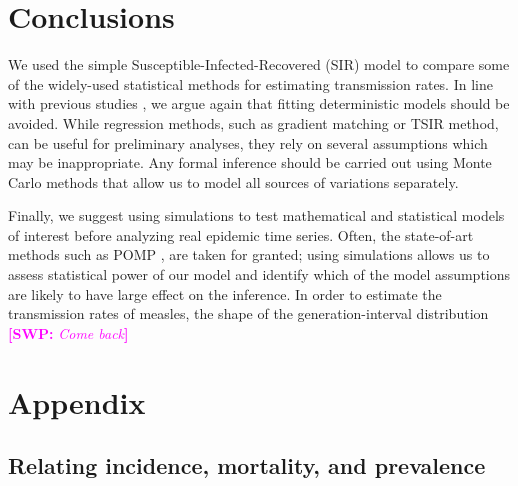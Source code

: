 \documentclass{article}
\newcommand{\comment}[3]{\textcolor{#1}{\textbf{[#2: }\textsl{#3}\textbf{]}}}
\newcommand{\swp}[1]{\comment{magenta}{SWP}{#1}}
\begin{document}
\section{Conclusions}

We used the simple Susceptible-Infected-Recovered (SIR) model to compare some of the widely-used statistical methods for estimating transmission rates.
In line with previous studies \citep{king2015avoidable, taylor2016stochasticity}, we argue again that fitting deterministic models should be avoided.
While regression methods, such as gradient matching or TSIR method, can be useful for preliminary analyses, 
they rely on several assumptions which may be inappropriate.
Any formal inference should be carried out using Monte Carlo methods that allow us to model all sources of variations separately.

Finally, we suggest using simulations to test mathematical and statistical models of interest before analyzing real epidemic time series.
Often, the state-of-art methods such as POMP \citep{king2015statistical}, are taken for granted;
using simulations allows us to assess statistical power of our model and identify which of the model assumptions are likely to have large effect on the inference.
In order to estimate the transmission rates of measles, the shape of the generation-interval distribution 
\swp{Come back}


\pagebreak

{} 


\pagebreak

\appendix
\renewcommand{\thesection}{\Alph{section}}
\renewcommand{\thesubsection}{A.\arabic{subsection}}

\section{Appendix}

\subsection{Relating incidence, mortality, and prevalence}
\end{document}
